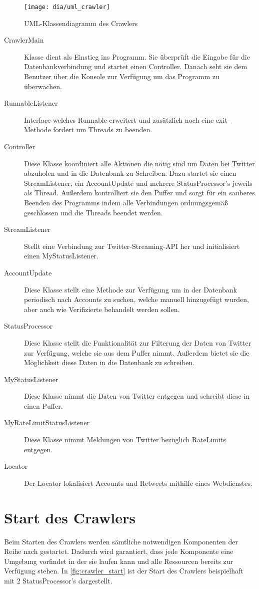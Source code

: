 \begin{figure}[h!]
	\centering
	\texttt{[image: dia/uml\_crawler]}
	\caption{UML-Klassendiagramm des Crawlers}
	\label{fig:uml_crawler}
\end{figure}

\begin{description}
\item[CrawlerMain] Klasse dient als Einstieg ins Programm. Sie überprüft die Eingabe für die Datenbankverbindung und startet einen Controller. Danach seht sie dem Benutzer über die Konsole zur Verfügung um das Programm zu überwachen.
\item[RunnableListener] Interface welches Runnable erweitert und zusätzlich noch eine exit-Methode fordert um Threads zu beenden.
\item[Controller] Diese Klasse koordiniert alle Aktionen die nötig sind um Daten bei Twitter abzuholen und in die Datenbank zu Schreiben. Dazu startet sie einen StreamListener, ein AccountUpdate und mehrere StatusProcessor's jeweils als Thread. Außerdem kontrolliert sie den Puffer und sorgt für ein sauberes Beenden des Programms indem alle Verbindungen ordnungsgemäß geschlossen und die Threads beendet werden.
\item[StreamListener] Stellt eine Verbindung zur Twitter-Streaming-API her und initialisiert einen MyStatusListener.
\item[AccountUpdate] Diese Klasse stellt eine Methode zur Verfügung um in der Datenbank periodisch nach Accounts zu suchen, welche manuell hinzugefügt wurden, aber auch wie Verifizierte behandelt werden sollen.
\item[StatusProcessor] Diese Klasse stellt die Funktionalität zur Filterung der Daten von Twitter zur Verfügung, welche sie aus dem Puffer nimmt. Außerdem bietet sie die Möglichkeit diese Daten in die Datenbank zu schreiben.
\item[MyStatusListener] Diese Klasse nimmt die Daten von Twitter entgegen und schreibt diese in einen Puffer.
\item[MyRateLimitStatusListener] Diese Klasse nimmt Meldungen von Twitter bezüglich RateLimits entgegen.
\item[Locator] Der Locator lokalisiert Accounts und Retweets mithilfe eines Webdienstes.
\end{description}

\section{Start des Crawlers}
Beim Starten des Crawlers werden sämtliche notwendigen Komponenten der Reihe nach gestartet. Dadurch wird garantiert, dass jede Komponente eine Umgebung vorfindet in der sie laufen kann und alle Ressourcen bereits zur Verfügung stehen. In \cref{fig:crawler_start} ist der Start des Crawlers beispielhaft mit 2 StatusProcessor's dargestellt.

